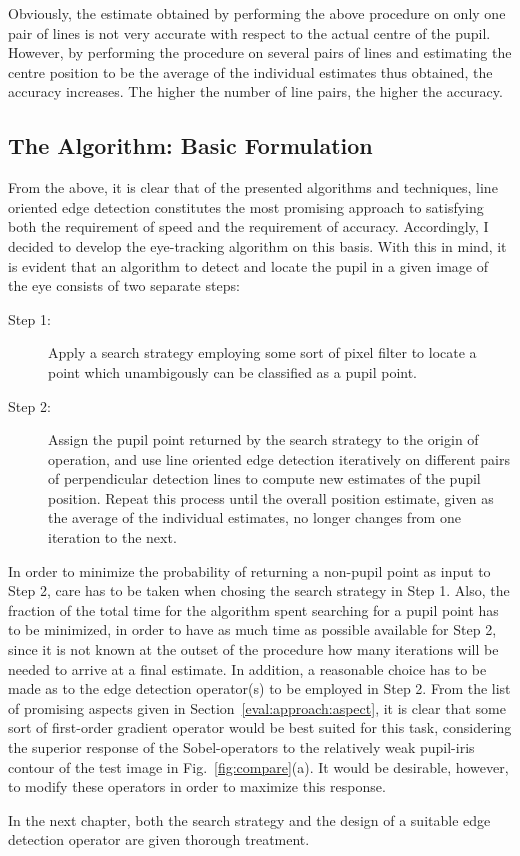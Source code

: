 Obviously, the estimate obtained by performing the above procedure on
only one pair of lines is not very accurate with respect to the actual
centre of the pupil.  However, by performing the procedure on several
pairs of lines and estimating the centre position to be the average of
the individual estimates thus obtained, the accuracy increases.  The
higher the number of line pairs, the higher the accuracy.

\subsection{The Algorithm: Basic Formulation}
\label{eval:approach:algo}

From the above, it is clear that of the presented algorithms and
techniques, line oriented edge detection constitutes the most
promising approach to satisfying both the requirement of speed and the
requirement of accuracy.  Accordingly, I decided to develop the
eye-tracking algorithm on this basis.  With this in mind, it is
evident that an algorithm to detect and locate the pupil in a given
image of the eye consists of two separate steps:

\begin{description}
\item[Step 1:] Apply a search strategy employing some sort of pixel
  filter to locate a point which unambigously can be classified as a
  pupil point.
\item[Step 2:] Assign the pupil point returned by the search strategy
  to the origin of operation, and use line oriented edge detection
  iteratively on different pairs of perpendicular detection lines to
  compute new estimates of the pupil position.  Repeat this process
  until the overall position estimate, given as the average of the
  individual estimates, no longer changes from one iteration to the
  next.
\end{description}

In order to minimize the probability of returning a non-pupil point as
input to Step 2, care has to be taken when chosing the search strategy
in Step 1.  Also, the fraction of the total time for the algorithm
spent searching for a pupil point has to be minimized, in order to
have as much time as possible available for Step 2, since it is not
known at the outset of the procedure how many iterations will be
needed to arrive at a final estimate.  In addition, a reasonable
choice has to be made as to the edge detection operator(s) to be
employed in Step 2.  From the list of promising aspects given in
Section~\ref{eval:approach:aspect}, it is clear that some sort of
first-order gradient operator would be best suited for this task,
considering the superior response of the Sobel-operators to the
relatively weak pupil-iris contour of the test image in
Fig.~\ref{fig:compare}(a).  It would be desirable, however, to modify
these operators in order to maximize this response.

In the next chapter, both the search strategy and the design of a
suitable edge detection operator are given thorough treatment.
